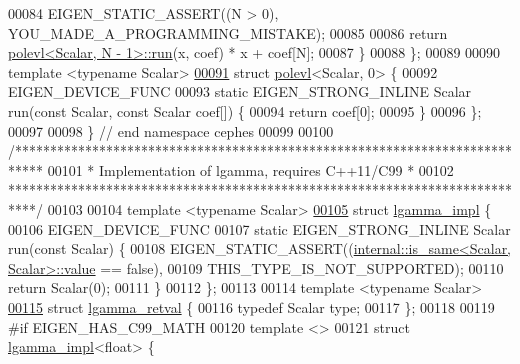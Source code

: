 \begin{DoxyCode}
00084     EIGEN\_STATIC\_ASSERT((N > 0), YOU\_MADE\_A\_PROGRAMMING\_MISTAKE);
00085 
00086     \textcolor{keywordflow}{return} \hyperlink{struct_eigen_1_1internal_1_1cephes_1_1polevl}{polevl<Scalar, N - 1>::run}(x, coef) * x + coef[N];
00087   \}
00088 \};
00089 
00090 \textcolor{keyword}{template} <\textcolor{keyword}{typename} Scalar>
\hyperlink{struct_eigen_1_1internal_1_1cephes_1_1polevl_3_01_scalar_00_010_01_4}{00091} \textcolor{keyword}{struct }\hyperlink{struct_eigen_1_1internal_1_1cephes_1_1polevl}{polevl}<Scalar, 0> \{
00092   EIGEN\_DEVICE\_FUNC
00093   \textcolor{keyword}{static} EIGEN\_STRONG\_INLINE Scalar run(\textcolor{keyword}{const} Scalar, \textcolor{keyword}{const} Scalar coef[]) \{
00094     \textcolor{keywordflow}{return} coef[0];
00095   \}
00096 \};
00097 
00098 \}  \textcolor{comment}{// end namespace cephes}
00099 
00100 \textcolor{comment}{/****************************************************************************}
00101 \textcolor{comment}{ * Implementation of lgamma, requires C++11/C99                             *}
00102 \textcolor{comment}{ ****************************************************************************/}
00103 
00104 \textcolor{keyword}{template} <\textcolor{keyword}{typename} Scalar>
\hyperlink{struct_eigen_1_1internal_1_1lgamma__impl}{00105} \textcolor{keyword}{struct }\hyperlink{struct_eigen_1_1internal_1_1lgamma__impl}{lgamma\_impl} \{
00106   EIGEN\_DEVICE\_FUNC
00107   \textcolor{keyword}{static} EIGEN\_STRONG\_INLINE Scalar run(\textcolor{keyword}{const} Scalar) \{
00108     EIGEN\_STATIC\_ASSERT((\hyperlink{struct_eigen_1_1internal_1_1is__same}{internal::is\_same<Scalar, Scalar>::value} 
      == \textcolor{keyword}{false}),
00109                         THIS\_TYPE\_IS\_NOT\_SUPPORTED);
00110     \textcolor{keywordflow}{return} Scalar(0);
00111   \}
00112 \};
00113 
00114 \textcolor{keyword}{template} <\textcolor{keyword}{typename} Scalar>
\hyperlink{struct_eigen_1_1internal_1_1lgamma__retval}{00115} \textcolor{keyword}{struct }\hyperlink{struct_eigen_1_1internal_1_1lgamma__retval}{lgamma\_retval} \{
00116   \textcolor{keyword}{typedef} Scalar type;
00117 \};
00118 
00119 \textcolor{preprocessor}{#if EIGEN\_HAS\_C99\_MATH}
00120 \textcolor{keyword}{template} <>
00121 \textcolor{keyword}{struct }\hyperlink{struct_eigen_1_1internal_1_1lgamma__impl}{lgamma\_impl}<float> \{

\end{DoxyCode}
